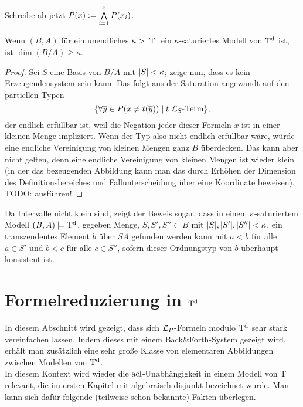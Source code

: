 \begin{definition}
	Schreibe ab jetzt $P(\overline{x}):=\bigwedge\limits_{i=1}^{\left| x \right|}P(x_i)$.
\end{definition}

\newpage

\begin{lemma}
	Wenn $(B,A)$ für ein unendliches $\kappa>{\left| \operatorname{T} \right|}$ ein $\kappa$-saturiertes Modell von $\operatorname{T^d}$ ist, ist $\dim(B/A)\geq\kappa$.
\end{lemma}
\begin{proof}
	Sei $S$ eine Basis von $B/A$ mit ${\left| S \right|}<\kappa$; zeige nun, dass es kein Erzeugendensystem sein kann. Das folgt aus der Saturation angewandt auf den partiellen Typen $$\{\forall\overline{y}\in P(x\neq t(\overline{y}))\mid t\ \mathcal{L}_S\text{-Term}\},$$ der endlich erfüllbar ist, weil die Negation jeder dieser Formeln \glqq{}$x$ ist in einer kleinen Menge\grqq{} impliziert. Wenn der Typ also nicht endlich erfüllbar wäre, würde eine endliche Vereinigung von kleinen Mengen ganz $B$ überdecken. Das kann aber nicht gelten, denn eine endliche Vereinigung von kleinen Mengen ist wieder klein (in der das bezeugenden Abbildung kann man das durch Erhöhen der Dimension des Definitionsbereiches und Fallunterscheidung über eine Koordinate beweisen). TODO: ausführen!
\end{proof}

\begin{corollary}\label{Finden transz Elte}
	Da Intervalle nicht klein sind, zeigt der Beweis sogar, dass in einem $\kappa$-saturiertem Modell $(B,A)\models\operatorname{T^d}$, gegeben Menge, $S,S',S''\subset B$ mit ${\left| S \right|},{\left| S' \right|},{\left| S'' \right|}<\kappa$, ein transzendentes Element $b$ über $SA$ gefunden werden kann mit $a<b$ für alle $a\in S'$ und $b<c$ für alle $c\in S''$, sofern dieser Ordnungstyp von $b$ überhaupt konsistent ist.
\end{corollary}

\newpage

\section{Formelreduzierung in $\operatorname{T^d}$}
In diesem Abschnitt wird gezeigt, dass sich $\mathcal{L}_P$-Formeln modulo $\operatorname{T^d}$ sehr stark vereinfachen lassen. Indem dieses mit einem Back\&Forth-System gezeigt wird, erhält man zusätzlich eine sehr große Klasse von elementaren Abbildungen zwischen Modellen von $\operatorname{T^d}$.\\
In diesem Kontext wird wieder die $\operatorname{acl}$-Unabhängigkeit in einem Modell von T relevant, die im ersten Kapitel mit \glqq{}algebraisch disjunkt\grqq{} bezeichnet wurde. Man kann sich dafür folgende (teilweise schon bekannte) Fakten überlegen.

